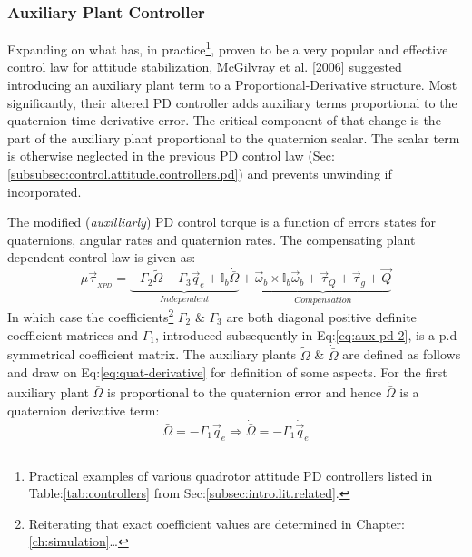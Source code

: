 {\subsubsection{Auxiliary Plant Controller}
\label{subsubsec:control.attitude.controllers.auxpd}
Expanding on what has, in practice\footnote{Practical examples of various quadrotor attitude PD controllers listed in Table:\ref{tab:controllers} from Sec:\ref{subsec:intro.lit.related}.}, proven to be a very popular and effective control law for attitude stabilization, McGilvray et al. [2006]\cite{attitudestabilization} suggested introducing an auxiliary plant term to a Proportional-Derivative structure. Most significantly, their altered PD controller adds auxiliary terms proportional to the quaternion time derivative error. The critical component of that change is the part of the auxiliary plant proportional to the quaternion scalar. The scalar term is otherwise neglected in the previous PD control law (Sec:\ref{subsubsec:control.attitude.controllers.pd}) and prevents unwinding if incorporated.
\par
The modified (\emph{auxilliarly}) PD control torque is a function of errors states for quaternions, angular rates and quaternion rates. The compensating plant dependent control law is given as:
\begin{equation}\label{eq:control-aux-pd}
\mu\vec{\tau}_{_{XPD}}=\underbrace{-\Gamma_2{\widetilde{\Omega}}-\Gamma_3\vec{q}_e+\mathbb{I}_b\dot{\bar{\Omega}}}_{Independent}+\underbrace{\vec{\omega}_b\times\mathbb{I}_b\vec{\omega}_b+\vec{\tau}_Q+\vec{\tau}_g+\vec{Q}}_{Compensation}
\end{equation}
In which case the coefficients\footnote{Reiterating that exact coefficient values are determined in Chapter:\ref{ch:simulation}\ldots} $\Gamma_2$ \& $\Gamma_3$ are both diagonal positive definite coefficient matrices and $\Gamma_1$, introduced subsequently in Eq:\ref{eq:aux-pd-2}, is a p.d symmetrical coefficient matrix. The auxiliary plants $\widetilde{\Omega}$ \& $\dot{\bar{\Omega}}$ are defined as follows and draw on Eq:\ref{eq:quat-derivative} for definition of some aspects. For the first auxiliary plant $\bar{\Omega}$ is proportional to the quaternion error and hence $\dot{\bar{\Omega}}$ is a quaternion derivative term:
\begin{subequations}\label{eq:aux-pd-1}
\begin{equation}
\bar{\Omega}=-\Gamma_1\vec{q}_e \Rightarrow\dot{\bar{\Omega}}=-\Gamma_1\dot{\vec{q}}_e
\end{equation}

\end{subequations}}
